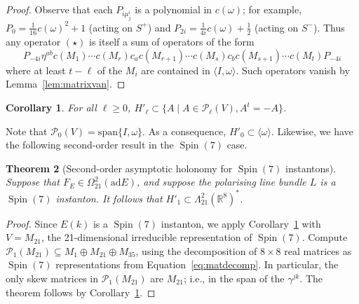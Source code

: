 \documentclass{article}
\newcommand{\real}{\mathbb{R}}
\newcommand{\ad}{\mathrm{ad}}
\newcommand{\vspan}{\mathrm{span}}
\DeclareMathOperator\Spin{Spin}
\newtheorem{theorem}{Theorem}
\newtheorem{corollary}[theorem]{Corollary}
\theoremstyle{definition}
\theoremstyle{remark}
\begin{document}
\begin{proof}
Observe that each $P_{i \mu^i_j}$ is a polynomial in $c(\omega)$; for example, $P_0 = \frac{1}{16} c(\omega)^2 + 1$ (acting on $S^+$) and $P_{2i} = \frac{1}{4i} c(\omega) + \frac{1}{2}$ (acting on $S^-$).
Thus any operator $(\star)$ is itself a sum of operators of the form
\[
    P_{-4i} \eta^{ab} c(M_1) \cdots c(M_r) c_a c(M_{r+1}) \cdots c(M_s) c_b c(M_{s+1}) \cdots c(M_t) P_{-4i}
\]
where at least $t - \ell$ of the $M_i$ are contained in $\langle I, \omega\rangle$.
Such operators vanish by Lemma~\ref{lem:matrixvan}.
\end{proof}

\begin{corollary}
    \label{cor:vancor}
    For all $\ell \ge 0$, $H'_\ell\subset \{ A \mid A \in \mathcal{P}_\ell(V), A^t = -A \}$.
\end{corollary}
Note that $\mathcal{P}_0(V) = \vspan\{I, \omega\}$.
As a consequence, $H'_0 \subset \langle \omega \rangle$.
Likewise, we have the following second-order result in the $\Spin(7)$ case.

\begin{theorem}[Second-order asymptotic holonomy for $\Spin(7)$ instantons]
    \label{thm:spin7hol}
    Suppose that $F_E \in \Omega^2_{21}(\ad E)$, and suppose the polarising line bundle $L$ is a $\Spin(7)$ instanton.
    It follows that $H'_1 \subset \Lambda^2_{21} (\real^8)^*$.
\end{theorem}
\begin{proof}
    Since $E(k)$ is a $\Spin(7)$ instanton, we apply Corollary~\ref{cor:vancor} with $V = M_{21}$, the 21-dimensional irreducible representation of $\Spin(7)$.
    Compute $\mathcal{P}_1(M_{21})\subseteq M_1 \oplus M_{21} \oplus M_{35}$, using the decomposition of $8 \times 8$ real matrices as $\Spin(7)$ representations from Equation~\eqref{eq:matdecomp}.
    In particular, the only skew matrices in $\mathcal{P}_1(M_{21})$ are $M_{21}$; i.e., in the span of the $\gamma^{jk}$.
    The theorem follows by Corollary~\ref{cor:vancor}.
\end{proof}
\end{document}
